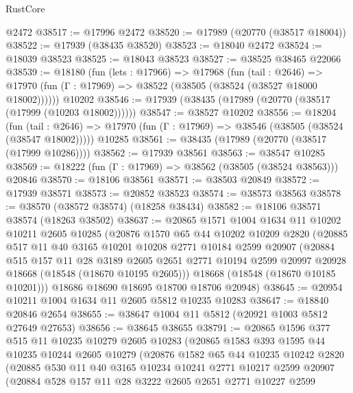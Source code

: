 \begin{lexlean}{RustCore}
\begin{coremodule}
    @2472
@38517 := @17996 @2472
@38520 := @17989 (@20770 (@38517 @18004))
@38522 := @17939 (@38435 @38520)
@38523 := @18040 @2472
@38524 := @18039 @38523
@38525 := @18043 @38523
@38527 := @38525 @38465 @22066
@38539 := @18180
    (fun (lets : @17966) =>
    @17968
      (fun (tail : @2646) =>
      @17970 (fun (Γ : @17969) => @38522 (@38505 (@38524 (@38527 @18000 @18002))))))
    @10202
@38546 := @17939 (@38435 (@17989 (@20770 (@38517 (@17999 (@10203 @18002))))))
@38547 := @38527 @10202
@38556 := @18204
    (fun (tail : @2646) => @17970 (fun (Γ : @17969) => @38546 (@38505 (@38524 (@38547 @18002)))))
    @10285
@38561 := @38435 (@17989 (@20770 (@38517 (@17999 @10286))))
@38562 := @17939 @38561
@38563 := @38547 @10285
@38569 := @18222 (fun (Γ : @17969) => @38562 (@38505 (@38524 @38563))) @20846
@38570 := @18106 @38561
@38571 := @38503 @20849
@38572 := @17939 @38571
@38573 := @20852 @38523
@38574 := @38573 @38563
@38578 := @38570 (@38572 @38574) (@18258 @38434)
@38582 := @18106 @38571 @38574 (@18263 @38502)
@38637 := @20865
    @1571
    @1004
    @1634
    @11
    @10202
    @10211
    @2605
    @10285
    (@20876
      @1570
      @65
      @44
      @10202
      @10209
      @2820
      (@20885
        @517
        @11
        @40
        @3165
        @10201
        @10208
        @2771
        @10184
        @2599
        @20907
        (@20884
          @515
          @157
          @11
          @28
          @3189
          @2605
          @2651
          @2771
          @10194
          @2599
          @20997
          @20928
          @18668
          (@18548 (@18670 @10195 @2605)))
        @18668
        (@18548 (@18670 @10185 @10201)))
      @18686
      @18690
      @18695
      @18700
      @18706
      @20948)
@38645 := @20954 @10211 @1004 @1634 @11 @2605 @5812 @10235 @10283
@38647 := @18840 @20846 @2654
@38655 := @38647 @1004 @11 @5812 (@20921 @1003 @5812 @27649 @27653)
@38656 := @38645 @38655
@38791 := @20865
    @1596
    @377
    @515
    @11
    @10235
    @10279
    @2605
    @10283
    (@20865
      @1583
      @393
      @1595
      @44
      @10235
      @10244
      @2605
      @10279
      (@20876
        @1582
        @65
        @44
        @10235
        @10242
        @2820
        (@20885
          @530
          @11
          @40
          @3165
          @10234
          @10241
          @2771
          @10217
          @2599
          @20907
          (@20884
            @528
            @157
            @11
            @28
            @3222
            @2605
            @2651
            @2771
            @10227
            @2599

\end{coremodule}
\end{lexlean}
